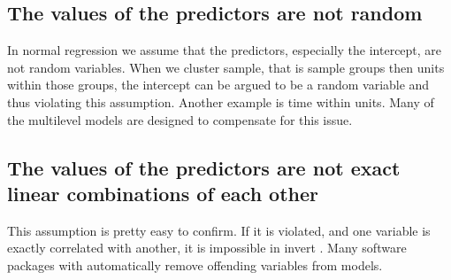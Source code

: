 \subsection{The values of the predictors are not random}
In normal regression we assume that the predictors, especially the intercept, are not random variables.  When we cluster sample, that is sample groups then units within those groups, the intercept can be argued to be a random variable and thus violating this assumption.  Another example is time within units.  Many of the multilevel models are designed to compensate for this issue.
\subsection{The values of the predictors are not exact linear combinations of each other}
This assumption is pretty easy to confirm. If it is violated, and one variable is exactly correlated with another, it is impossible in invert . Many software packages with automatically remove offending variables from models.
